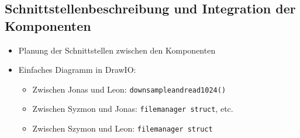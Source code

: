 \newpage

\subsection{Schnittstellenbeschreibung und Integration der Komponenten}
\begin{itemize}
    \item Planung der Schnittstellen zwischen den Komponenten
    \item Einfaches Diagramm in DrawIO:
    \begin{itemize}
        \item Zwischen Jonas und Leon: \texttt{downsampleandread1024()}
        \item Zwischen Syzmon und Jonas: \texttt{filemanager struct}, etc.
        \item Zwischen Szymon und Leon: \texttt{filemanager struct}
    \end{itemize}
\end{itemize}